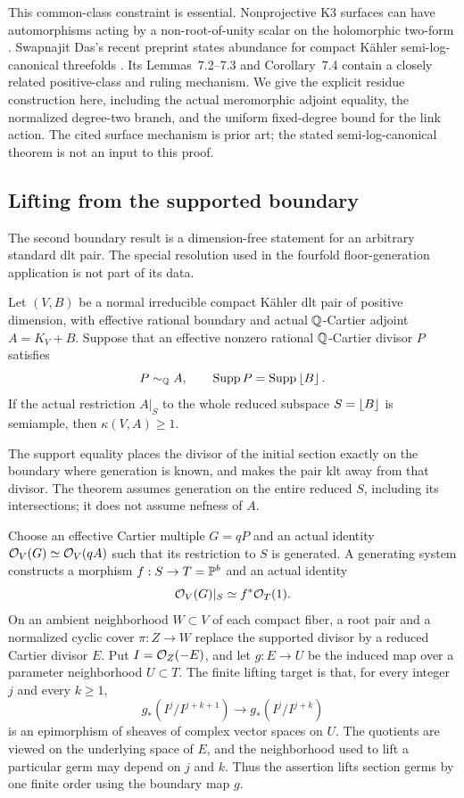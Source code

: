 This common-class constraint is essential.  Nonprojective K3 surfaces
can have automorphisms acting by a non-root-of-unity scalar on the
holomorphic two-form \cite[Theorems~3.5 and~4.1]{McMullen2002}.
Swapnajit Das's recent preprint states abundance for compact K\"ahler
semi-log-canonical threefolds \cite[Theorem~1.3]{Das2026}.  Its
Lemmas~7.2--7.3 and Corollary~7.4 contain a closely related
positive-class and ruling mechanism.  We give the explicit residue
construction here, including the actual meromorphic adjoint equality,
the normalized degree-two branch, and the uniform fixed-degree bound for
the link action.  The cited surface mechanism is prior art; the stated
semi-log-canonical theorem is not an input to this proof.

\subsection*{Lifting from the supported boundary}

The second boundary result is a dimension-free statement for an arbitrary
standard dlt pair.  The special resolution used in the fourfold
floor-generation application is not part of its data.

\begin{theorem}\label{thm:supported-lifting}
Let \((V,B)\) be a normal irreducible compact K\"ahler dlt pair of positive
dimension, with effective rational boundary and actual \(\mathbb Q\)-Cartier
adjoint \(A=K_V+B\).  Suppose that an effective nonzero rational
\(\mathbb Q\)-Cartier divisor \(P\) satisfies
\[
 P\sim_\mathbb Q A,\qquad \operatorname{Supp} P=\operatorname{Supp}\left\lfloor B\right\rfloor.
\]
If the actual restriction \(A|_S\) to the whole reduced subspace
\(S=\left\lfloor B\right\rfloor\) is semiample, then \(\kappa(V,A)\geq1\).
\end{theorem}

The support equality places the divisor of the initial section exactly
on the boundary where generation is known, and makes the pair klt away
from that divisor.  The theorem assumes generation on the entire reduced
\(S\), including its intersections; it does not assume nefness of \(A\).

Choose an effective Cartier multiple \(G=qP\) and an actual identity
\(\mathcal O_V(G)\simeq\mathcal O_V(qA)\) such that its restriction to \(S\) is
generated.  A generating system constructs a morphism
\(f:S\to T=\mathbb P^b\) and an actual identity
\[
 \mathcal O_V(G)|_S\simeq f^*\mathcal O_T(1).
\]
On an ambient neighborhood \(W\subset V\) of each compact fiber, a
root pair and a normalized cyclic cover \(\pi:Z\to W\) replace the
supported divisor by a reduced Cartier
divisor \(E\).  Put \(I=\mathcal O_Z(-E)\), and let \(g:E\to U\) be the
induced map over a parameter neighborhood \(U\subset T\).  The finite
lifting target is that, for every integer \(j\) and every \(k\geq1\),
\[
 g_*(I^j/I^{j+k+1})\longrightarrow g_*(I^j/I^{j+k})
\]
is an epimorphism of sheaves of complex vector spaces on \(U\).
The quotients are viewed on the underlying space of \(E\), and the
neighborhood used to lift a particular germ may depend on \(j\) and
\(k\).  Thus the assertion lifts section germs by one finite order using
the boundary map \(g\).

